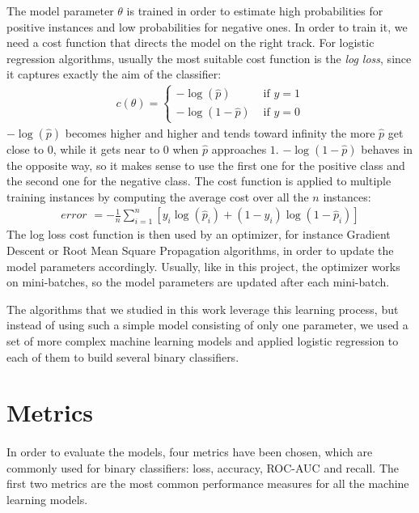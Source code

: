 The model parameter $\theta$ is trained in order to estimate high probabilities for positive instances and low probabilities for negative ones. In order to train it, we need a cost function that directs the model on the right track. For logistic regression algorithms, usually the most suitable cost function is the \textit{log loss}, since it captures exactly the aim of the classifier:
\begin{align}
    c(\theta) = \left\{\begin{array}{ll}{-\log (\hat{p})} & {\text { if } y=1} \\ {-\log (1-\hat{p})} & {\text { if } y=0}\end{array}\right.
\end{align}
$-\log (\hat{p})$ becomes higher and higher and tends toward infinity the more $\hat{p}$ get close to $0$, while it gets near to $0$ when $\hat{p}$ approaches $1$. $-\log (1-\hat{p})$ behaves in the opposite way, so it makes sense to use the first one for the positive class and the second one for the negative class. The cost function is applied to multiple training instances by computing the average cost over all the $n$ instances:
\begin{align}
    \textit{error } = -\frac{1}{n} \sum^{n}_{i=1}\left[y_i \log(\hat{p}_i) +
    (1 - y_i) \log(1 - \hat{p}_i)\right]
\end{align}
The log loss cost function is then used by an optimizer, for instance Gradient Descent or Root Mean Square Propagation algorithms, in order to update the model parameters accordingly. Usually, like in this project, the optimizer works on mini-batches, so the model parameters are updated after each mini-batch.

The algorithms that we studied in this work leverage this learning process, but instead of using such a simple model consisting of only one parameter, we used a set of more complex machine learning models and applied logistic regression to each of them to build several binary classifiers.


\section{Metrics} \label{sec: metrics}
\paragraph{} In order to evaluate the models, four metrics have been chosen, which are commonly used for binary classifiers: loss, accuracy, ROC-AUC and recall. The first two metrics are the most common performance measures for all the machine learning models.

